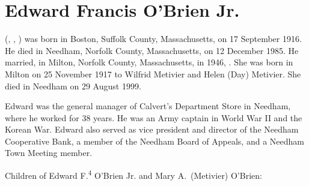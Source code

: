 \section{Edward Francis O'Brien Jr.}\label{per:Edward4OBrien}

 (, , ) was born in Boston, Suffolk County, Massachusetts, on 17 September 1916.\cite{Edward4OBrien2Birth} He died in Needham, Norfolk County, Massachusetts, on 12 December 1985.\cite{Edward4OBrien2Death,Edward2OBrien2Obit:1} He married, in Milton, Norfolk County, Massachusetts, in 1946, .\cite{Edward4OBrien2Marriage} She was born in Milton on 25 November 1917 to Wilfrid Metivier and Helen (Day) Metivier.\cite{MaryMetivierBirth} She died in Needham on 29 August 1999.\cite{MaryMetivierDeath}

Edward was the general manager of Calvert's Department Store in Needham, where he worked for 38 years. He was an Army captain in World War II and the Korean War. Edward also served as vice president and director of the Needham Cooperative Bank, a member of the Needham Board of Appeals, and a Needham Town Meeting member.\cite{Edward4OBrien2Obit:2}

\begin{KidsIntro}
	Children of Edward F.\textsuperscript{4} O'Brien Jr. and Mary A.\ (Metivier) O'Brien:
\end{KidsIntro}

\begin{Kids}
	\KidNum{}{$\bullet$}
	
	\KidNum{}{$\bullet$}
	
	\KidNum{}{$\bullet$}
	
	\KidNum{}{$\bullet$}
\end{Kids}
